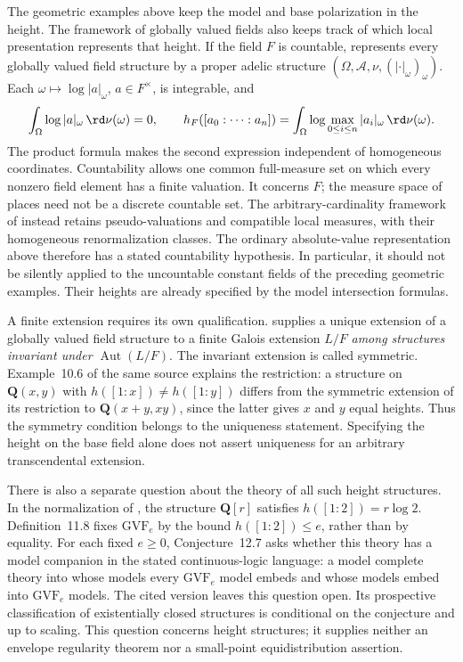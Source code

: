 The geometric examples above keep the model and base polarization in the
height.  The framework of globally valued fields also keeps track of which
local presentation represents that height.  If the field $F$ is countable,
\cite[Corollary~7.11]{BDHS26GVFFoundationsV2} represents every globally
valued field structure by a proper adelic structure
$(\Omega,\mathcal A,\nu,(|\cdot|_\omega)_\omega)$.  Each
$\omega\mapsto\log|a|_\omega$, $a\in F^\times$, is integrable, and
\[
  \int_\Omega\log|a|_\omega\,\rd\nu(\omega)=0,
  \qquad
  h_F([a_0:\cdots:a_n])
    =\int_\Omega\log\max_{0\leq i\leq n}|a_i|_\omega
          \,\rd\nu(\omega).
\]
The product formula makes the second expression independent of homogeneous
coordinates.  Countability allows one common full-measure set on which
every nonzero field element has a finite valuation.  It concerns $F$;
the measure space of places need not be a discrete countable set.
The arbitrary-cardinality framework of
\cite[Theorem~7.7]{BDHS26GVFFoundationsV2} instead retains pseudo-valuations
and compatible local measures, with their homogeneous renormalization
classes.  The ordinary absolute-value representation above therefore has
a stated countability hypothesis.  In particular, it should not be
silently applied to the uncountable constant fields of the preceding
geometric examples.  Their heights are already specified by the model
intersection formulas.

A finite extension requires its own qualification.
\cite[Proposition~10.5]{BDHS26GVFFoundationsV2} supplies a unique extension
of a globally valued field structure to a finite Galois extension $L/F$
\emph{among structures invariant under $\operatorname{Aut}(L/F)$}.
The invariant extension is called symmetric.  Example~10.6 of the same
source explains the restriction: a structure on $\mathbf Q(x,y)$ with
$h([1:x])\ne h([1:y])$ differs from the symmetric extension of its
restriction to $\mathbf Q(x+y,xy)$, since the latter gives $x$ and $y$
equal heights.  Thus the symmetry condition belongs to the uniqueness
statement.  Specifying the height on the base field alone does not assert
uniqueness for an arbitrary transcendental extension.

There is also a separate question about the theory of all such height
structures.  In the normalization of
\cite[Lemma~10.2]{BDHS26GVFFoundationsV2}, the structure $\mathbf Q[r]$
satisfies $h([1:2])=r\log2$.  Definition~11.8 fixes
$\mathrm{GVF}_e$ by the bound $h([1:2])\leq e$, rather than by equality.
For each fixed $e\geq0$, Conjecture~12.7 asks whether this theory has a
model companion in the stated continuous-logic language: a model complete
theory into whose models every $\mathrm{GVF}_e$ model embeds and whose
models embed into $\mathrm{GVF}_e$ models.  The cited version leaves this
question open.  Its prospective classification of existentially closed
structures is conditional on the conjecture and up to scaling.  This
question concerns height structures; it supplies neither an envelope
regularity theorem nor a small-point equidistribution assertion.


